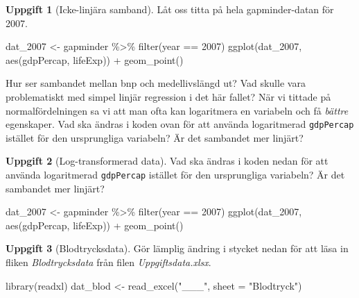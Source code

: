 \documentclass[
]{book}
\newenvironment{Shaded}{\begin{snugshade}}{\end{snugshade}}
\newcommand{\AttributeTok}[1]{\textcolor[rgb]{0.77,0.63,0.00}{#1}}
\newcommand{\DecValTok}[1]{\textcolor[rgb]{0.00,0.00,0.81}{#1}}
\newcommand{\FunctionTok}[1]{\textcolor[rgb]{0.00,0.00,0.00}{#1}}
\newcommand{\NormalTok}[1]{#1}
\newcommand{\OtherTok}[1]{\textcolor[rgb]{0.56,0.35,0.01}{#1}}
\newcommand{\SpecialCharTok}[1]{\textcolor[rgb]{0.00,0.00,0.00}{#1}}
\newcommand{\StringTok}[1]{\textcolor[rgb]{0.31,0.60,0.02}{#1}}
\theoremstyle{definition}
\theoremstyle{definition}
\theoremstyle{definition}
\newtheorem{exercise}{Uppgift}[chapter]
\theoremstyle{definition}
\theoremstyle{remark}
\begin{document}
\begin{exercise}[Icke-linjära samband]
Låt oss titta på hela gapminder-datan för 2007.

\begin{Shaded}
\begin{Highlighting}[]
\NormalTok{dat\_2007 }\OtherTok{\textless{}{-}}\NormalTok{ gapminder }\SpecialCharTok{\%\textgreater{}\%} \FunctionTok{filter}\NormalTok{(year }\SpecialCharTok{==} \DecValTok{2007}\NormalTok{)}
\FunctionTok{ggplot}\NormalTok{(dat\_2007, }\FunctionTok{aes}\NormalTok{(gdpPercap, lifeExp)) }\SpecialCharTok{+} \FunctionTok{geom\_point}\NormalTok{()}
\end{Highlighting}
\end{Shaded}

Hur ser sambandet mellan bnp och medellivslängd ut? Vad skulle vara problematiskt med simpel linjär regression i det här fallet? När vi tittade på normalfördelningen sa vi att man ofta kan logaritmera en variabeln och få \emph{bättre} egenskaper. Vad ska ändras i koden ovan för att använda logaritmerad \texttt{gdpPercap} istället för den ursprungliga variabeln? Är det sambandet mer linjärt?
\end{exercise}

\begin{exercise}[Log-transformerad data]

Vad ska ändras i koden nedan för att använda logaritmerad \texttt{gdpPercap} istället för den ursprungliga variabeln? Är det sambandet mer linjärt?

\begin{Shaded}
\begin{Highlighting}[]
\NormalTok{dat\_2007 }\OtherTok{\textless{}{-}}\NormalTok{ gapminder }\SpecialCharTok{\%\textgreater{}\%} \FunctionTok{filter}\NormalTok{(year }\SpecialCharTok{==} \DecValTok{2007}\NormalTok{)}
\FunctionTok{ggplot}\NormalTok{(dat\_2007, }\FunctionTok{aes}\NormalTok{(gdpPercap, lifeExp)) }\SpecialCharTok{+} \FunctionTok{geom\_point}\NormalTok{()}
\end{Highlighting}
\end{Shaded}

\end{exercise}

\begin{exercise}[Blodtrycksdata]

Gör lämplig ändring i stycket nedan för att läsa in fliken \emph{Blodtrycksdata} från filen \emph{Uppgiftsdata.xlsx}.

\begin{Shaded}
\begin{Highlighting}[]
\FunctionTok{library}\NormalTok{(readxl)}
\NormalTok{dat\_blod }\OtherTok{\textless{}{-}} \FunctionTok{read\_excel}\NormalTok{(}\StringTok{"\_\_\_"}\NormalTok{, }\AttributeTok{sheet =} \StringTok{"Blodtryck"}\NormalTok{)}
\end{Highlighting}
\end{Shaded}

\end{exercise}
\end{document}
